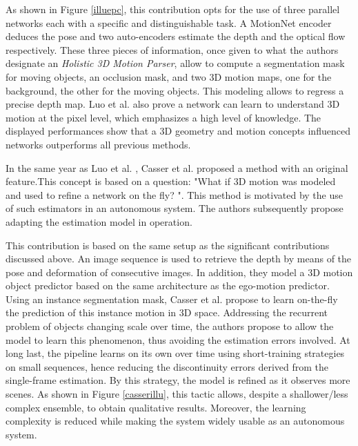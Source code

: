 As shown in Figure \ref{illuepc}, this contribution opts for the use of three parallel networks each with a specific and distinguishable task. A MotionNet encoder deduces the pose and two auto-encoders estimate the depth and the optical flow respectively. These three pieces of information, once given to what the authors designate an \emph{Holistic 3D Motion Parser}, allow to compute a segmentation mask for moving objects, an occlusion mask, and two 3D motion maps, one for the background, the other for the moving objects. This modeling allows to regress a precise depth map. Luo et al. also prove a network can learn to understand 3D motion at the pixel level, which emphasizes a high level of knowledge. The displayed performances show that a 3D geometry and motion concepts influenced networks outperforms all previous methods.


In the same year as Luo et al. \cite{luo2019every}, Casser et al. \cite{casser2019depth} proposed a method with an original feature.This concept is based on a question: "What if 3D motion was modeled and used to refine a network on the fly? ". This method is motivated by the use of such estimators in an autonomous system. The authors subsequently propose adapting the estimation model in operation.

This contribution is based on the same setup as the significant contributions discussed above. An image sequence is used to retrieve the depth by means of the pose and deformation of consecutive images. In addition, they model a 3D motion object predictor based on the same architecture as the ego-motion predictor. Using an instance segmentation mask, Casser et al. propose to learn on-the-fly the prediction of this instance motion in 3D space. Addressing the recurrent problem of objects changing scale over time, the authors propose to allow the model to learn this phenomenon, thus avoiding the estimation errors involved. At long last, the pipeline learns on its own over time using short-training strategies on small sequences, hence reducing the discontinuity errors derived from the single-frame estimation. By this strategy, the model is refined as it observes more scenes. As shown in Figure \ref{casserillu}, this tactic allows, despite a shallower/less complex ensemble, to obtain qualitative results. Moreover, the learning complexity is reduced while making the system widely usable as an autonomous system. 

